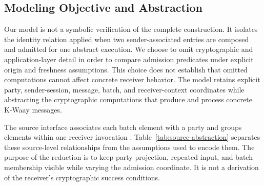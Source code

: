 
\subsection{Modeling Objective and Abstraction}

Our model is not a symbolic verification of the complete \kwaay construction.
It isolates the identity relation applied when two sender-associated entries
are composed and admitted for one abstract \batchreceive execution. We choose
to omit cryptographic and application-layer detail in order to compare
admission predicates under explicit origin and freshness assumptions. This
choice does not establish that omitted computations cannot affect concrete
receiver behavior. The model retains explicit party,
sender-session, message, batch, and receiver-context coordinates while
abstracting the cryptographic computations that produce and process concrete
K-Waay messages.

The source interface associates each batch element with a party and groups
elements within one receiver invocation
\cite[Secs.~4.1 and~5.1]{collins2024kwaayfull}.
Table~\ref{tab:source-abstraction} separates these source-level relationships
from the assumptions used to encode them. The purpose of the reduction is to
keep party projection, repeated input, and batch membership visible while
varying the admission coordinate. It is not a derivation of the receiver's
cryptographic success conditions.

